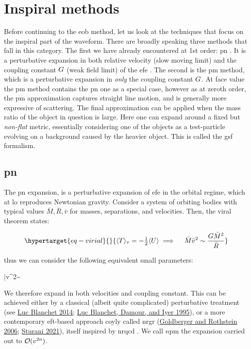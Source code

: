 \documentclass[
  11pt,
  a4paper,
  DIV=11,
  numbers=noendperiod,
  oneside]{scrreprt}
\let\[\relax \let\]\relax %
\DeclareRobustCommand{\[}{\begin{equation}}
\DeclareRobustCommand{\]}{\end{equation}}
\begin{document}
\hypertarget{inspiral-methods}{%
\section{Inspiral methods}\label{inspiral-methods}}

Before continuing to the \gls{eob} method, let us look at the techniques
that focus on the inspiral part of the waveform. There are broadly
speaking three methods that fall in this category. The first we have
already encountered at 1st order: \gls{pn} . It is a perturbative
expansion in both relative velocity (slow moving limit) and the coupling
constant \(\grav\) (weak field limit) of the \gls{efe} . The second is
the \gls{pm} method, which is a perturbative expansion in \emph{only}
the coupling constant \(\grav\). At face value the \gls{pm} method
contains the \gls{pn} one as a special case, however as at zeroth order,
the \gls{pm} approximation captures straight line motion, and is
generally more expressive of scattering. The final approximation can be
applied when the mass ratio of the object in question is large. Here one
can expand around a fixed but \emph{non-flat} metric, essentially
considering one of the objects as a test-particle evolving on a
background caused by the heavier object. This is called the \gls{gsf}
formalism.

\hypertarget{pn}{%
\subsection{\texorpdfstring{\acrlong{pn}}{}}\label{pn}}

The \acrfull{pn} expansion, is a perturbative expansion of \gls{efe} in
the orbital regime, which at \gls{lo} reproduces Newtonian gravity.
Consider a system of orbiting bodies with typical values
\(\bar{M},\bar{R},\bar{v}\) for masses, separations, and velocities.
Then, the viral theorem states:

\begin{equation}\protect\hypertarget{eq-virial}{}{
\ang{T}_\tau=-\half \ang{U} \implies \quad \bar{M} \bar{v}^2\sim \frac{G \bar{M}^2}{\bar{R}}
}\label{eq-virial}\end{equation}

thus we can consider the following equivalent small parameters:

\[
\bar{v}^2\sim {}
\]

We therefore expand in both velocities and coupling constant. This can
be achieved either by a classical (albeit quite complicated)
perturbative treatment (see \protect\hyperlink{ref-Blanchet:2013haa}{Luc
Blanchet 2014}; \protect\hyperlink{ref-Blanchet:1995fg}{Luc Blanchet,
Damour, and Iyer 1995}), or a more contemporary \gls{eft}-based approach
coyly called \gls{nrgr}
(\protect\hyperlink{ref-Goldberger:2004jt}{Goldberger and Rothstein
2006}; \protect\hyperlink{ref-Sturani:2021xpq}{Sturani 2021}), itself
inspired by \gls{nrqcd} . We call \(n\)\gls{pm} the expansion carried
out to \(\order[2n]{v}\).
\end{document}
